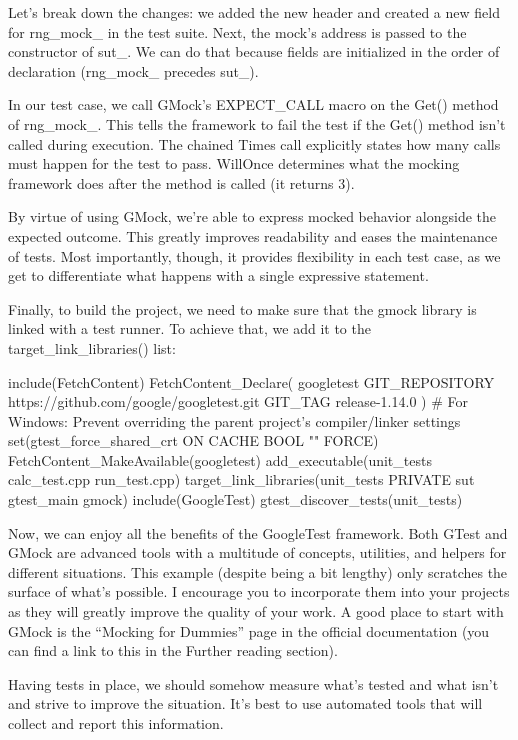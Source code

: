 Let’s break down the changes: we added the new header and created a new field for rng\_mock\_ in the test suite. Next, the mock’s address is passed to the constructor of sut\_. We can do that because fields are initialized in the order of declaration (rng\_mock\_ precedes sut\_).

In our test case, we call GMock’s EXPECT\_CALL macro on the Get() method of rng\_mock\_. This tells the framework to fail the test if the Get() method isn’t called during execution. The chained Times call explicitly states how many calls must happen for the test to pass. WillOnce determines what the mocking framework does after the method is called (it returns 3).

By virtue of using GMock, we’re able to express mocked behavior alongside the expected outcome. This greatly improves readability and eases the maintenance of tests. Most importantly, though, it provides flexibility in each test case, as we get to differentiate what happens with a single expressive statement.

Finally, to build the project, we need to make sure that the gmock library is linked with a test runner. To achieve that, we add it to the target\_link\_libraries() list:


\begin{cmake}
include(FetchContent)
FetchContent_Declare(
    googletest
    GIT_REPOSITORY https://github.com/google/googletest.git
    GIT_TAG release-1.14.0
)
# For Windows: Prevent overriding the parent project's compiler/linker settings
set(gtest_force_shared_crt ON CACHE BOOL "" FORCE)
FetchContent_MakeAvailable(googletest)
add_executable(unit_tests
               calc_test.cpp
               run_test.cpp)
target_link_libraries(unit_tests PRIVATE sut gtest_main gmock)
include(GoogleTest)
gtest_discover_tests(unit_tests)
\end{cmake}

Now, we can enjoy all the benefits of the GoogleTest framework. Both GTest and GMock are advanced tools with a multitude of concepts, utilities, and helpers for different situations. This example (despite being a bit lengthy) only scratches the surface of what’s possible. I encourage you to incorporate them into your projects as they will greatly improve the quality of your work. A good place to start with GMock is the “Mocking for Dummies” page in the official documentation (you can find a link to this in the Further reading section).

Having tests in place, we should somehow measure what’s tested and what isn’t and strive to improve the situation. It’s best to use automated tools that will collect and report this information.

















